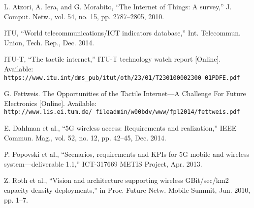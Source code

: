 \documentclass[12pt,journal,compsoc]{IEEEtran}
\begin{document}
\renewcommand{\refname}{Referencias}
\begin{thebibliography}{11}

 L. Atzori, A. Iera, and G. Morabito, “The Internet of Things: A survey,” J. Comput. Netw., vol. 54, no. 15, pp. 2787–2805, 2010.

 ITU, “World telecommunications/ICT indicators database,” Int. Telecommun. Union, Tech. Rep., Dec. 2014.

 ITU-T, “The tactile internet,” ITU-T technology watch report [Online]. Available:
\\\texttt{https://www.itu.int/dms\_{}pub/itu\-{}t/oth/23/01/T230100002300 01PDFE.pdf}

 G. Fettweis. The Opportunities of the Tactile Internet—A Challenge For Future Electronics [Online]. Available: 
\\\texttt{http://www.lis.ei.tum.de/ fileadmin/w00bdv/www/fpl2014/fettweis.pdf} 

 E. Dahlman et al., “5G wireless access: Requirements and realization,” IEEE Commun. Mag., vol. 52, no. 12, pp. 42–45, Dec. 2014.

 P. Popovski et al., “Scenarios, requirements and KPIs for 5G mobile and wireless system—deliverable 1.1,” ICT-317669 METIS Project, Apr. 2013.

 Z. Roth et al., “Vision and architecture supporting wireless GBit/sec/km2 capacity density deployments,” in Proc. Future Netw. Mobile Summit, Jun. 2010, pp. 1–7.

\end{thebibliography}
\end{document}
